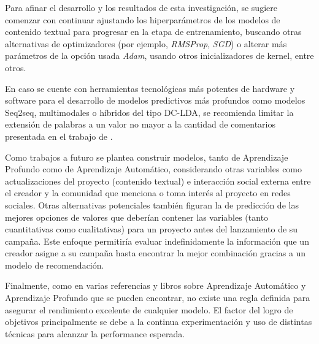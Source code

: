 Para afinar el desarrollo y los resultados de esta investigación, se sugiere comenzar con continuar ajustando los hiperparámetros de los modelos de contenido textual para progresar en la etapa de entrenamiento, buscando otras alternativas de optimizadores (por ejemplo, \textit{RMSProp}, \textit{SGD}) o alterar más parámetros de la opción usada \textit{Adam}, usando otros inicializadores de kernel, entre otros.

En caso se cuente con herramientas tecnológicas más potentes de hardware y software para el desarrollo de modelos predictivos más profundos como modelos Seq2seq, multimodales o híbridos del tipo DC-LDA, se recomienda limitar la extensión de palabras a un valor no mayor a la cantidad de comentarios presentada en el trabajo de \cite{pr_shafqat2019topicpredictions}.

Como trabajos a futuro se plantea construir modelos, tanto de Aprendizaje Profundo como de Aprendizaje Automático, considerando otras variables como actualizaciones del proyecto (contenido textual) e interacción social externa entre el creador y la comunidad que menciona o toma interés al proyecto en redes sociales. Otras alternativas potenciales también figuran la de predicción de las mejores opciones de valores que deberían contener las variables (tanto cuantitativas como cualitativas) para un proyecto antes del lanzamiento de su campaña. Este enfoque permitiría evaluar indefinidamente la información que un creador asigne a su campaña hasta encontrar la mejor combinación gracias a un modelo de recomendación.

Finalmente, como en varias referencias y libros sobre Aprendizaje Automático y Aprendizaje Profundo que se pueden encontrar, no existe una regla definida para asegurar el rendimiento excelente de cualquier modelo. El factor del logro de objetivos principalmente se debe a la continua experimentación y uso de distintas técnicas para alcanzar la performance esperada.
